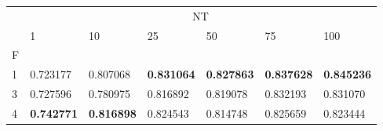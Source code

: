 \begin{table}[htbp]
\centering
\label{heart-results}
\begin{tabular}{lllllll}
\toprule
 & \multicolumn{6}{c}{NT} \\
 & 1 & 10 & 25 & 50 & 75 & 100 \\
F &  &  &  &  &  &  \\
\midrule
1 & 0.723177 & 0.807068 & \textbf{0.831064} & \textbf{0.827863} & \textbf{0.837628} & \textbf{0.845236} \\
3 & 0.727596 & 0.780975 & 0.816892 & 0.819078 & 0.832193 & 0.831070 \\
4 & \textbf{0.742771} & \textbf{0.816898} & 0.824543 & 0.814748 & 0.825659 & 0.823444 \\
\bottomrule
\end{tabular}
\end{table}
